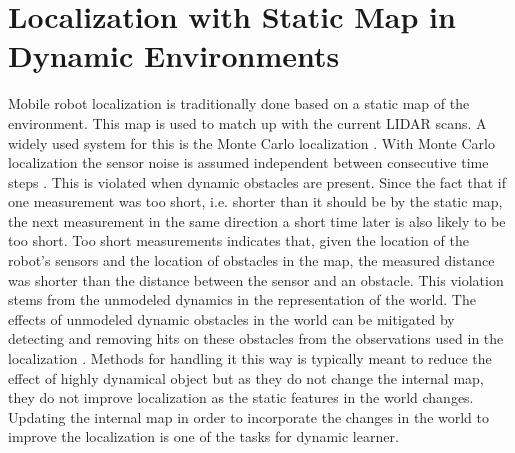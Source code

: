 \section{Localization with Static Map in Dynamic Environments}
Mobile robot localization is traditionally done based on a static map of the environment. This map is used to match up with the current LIDAR scans. A widely used system for this is the Monte Carlo localization \cite{probRob}. 
With Monte Carlo localization the sensor noise is assumed independent between consecutive time steps \cite{probRob}. This is violated when dynamic obstacles are present. Since the fact that if one measurement was too short, i.e. shorter than it should be by the static map, the next measurement in the same direction a short time later is also likely to be too short. Too short measurements indicates that, given the location of the robot’s sensors and the location of obstacles in the map, the measured distance was shorter than the distance between the sensor and an obstacle. This violation stems from the unmodeled dynamics in the representation of the world. The effects of unmodeled dynamic obstacles in the world can be mitigated by detecting and removing hits on these obstacles from the observations used in the localization \cite{tang2015approach}\cite{fox1998position}. Methods for handling it this way is typically meant to reduce the effect of highly dynamical object but as they do not change the internal map, they do not improve localization as the static features in the world changes. Updating the internal map in order to incorporate the changes in the world to improve the localization is one of the tasks for dynamic learner. 
